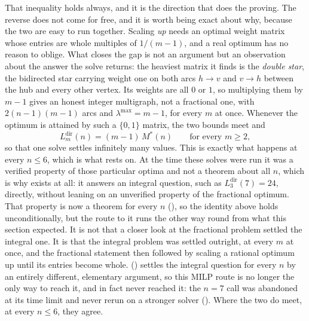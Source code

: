 That inequality holds always, and it is the direction that does the proving. The reverse does not come for free, and it is worth being exact about why, because the two are easy to run together. Scaling \emph{up} needs an optimal weight matrix whose entries are whole multiples of $1/(m-1)$, and a real optimum has no reason to oblige. What closes the gap is not an argument but an observation about the answer the solve returns: the heaviest matrix it finds is the \emph{double star}, the bidirected star carrying weight one on both arcs $h \to v$ and $v \to h$ between the hub and every other vertex. Its weights are all $0$ or $1$, so multiplying them by $m - 1$ gives an honest integer multigraph, not a fractional one, with $2(n-1)(m-1)$ arcs and $\lambda^{\max} = m - 1$, for every $m$ at once. Whenever the optimum is attained by such a $\{0,1\}$ matrix, the two bounds meet and
\[
    L_m^{\mathrm{dir}}(n) = (m - 1)\, M^{*}(n)
    \qquad \text{for every } m \ge 2 ,
\]
so that one solve settles infinitely many values. This is exactly what happens at every $n \le 6$, which is what  rests on. At the time these solves were run it was a verified property of those particular optima and not a theorem about all $n$, which is why  exists at all: it answers an integral question, such as $L_3^{\mathrm{dir}}(7) = 24$, directly, without leaning on an unverified property of the fractional optimum. That property is now a theorem for every $n$ (), so the identity above holds unconditionally, but the route to it runs the other way round from what this section expected. It is not that a closer look at the fractional problem settled the integral one. It is that the integral problem was settled outright, at every $m$ at once, and the fractional statement then followed by scaling a rational optimum up until its entries become whole.  () settles the integral question for every $n$ by an entirely different, elementary argument, so this MILP route is no longer the only way to reach it, and in fact never reached it: the $n = 7$ call was abandoned at its time limit and never rerun on a stronger solver (). Where the two do meet, at every $n \le 6$, they agree.

